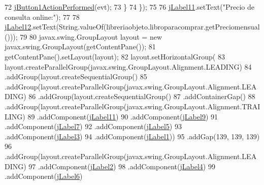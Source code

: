 \begin{DoxyCode}
72                 \mbox{\hyperlink{class_interfaz_package_1_1_consulta_libro_a043c35370f2e4eefae07c77fda717bf7}{jButton1ActionPerformed}}(evt);
73             \}
74         \});
75 
76         \mbox{\hyperlink{class_interfaz_package_1_1_consulta_libro_ae94f652b20072c79107b06192a514608}{jLabel11}}.setText(\textcolor{stringliteral}{"Precio de consulta online:"});
77 
78         \mbox{\hyperlink{class_interfaz_package_1_1_consulta_libro_a22c3d5f2c9bebc19190d3eb57195b720}{jLabel12}}.setText(String.valueOf(libreriaobjeto.libroparacomprar.getPreciomensual()));
79 
80         javax.swing.GroupLayout layout = \textcolor{keyword}{new} javax.swing.GroupLayout(getContentPane());
81         getContentPane().setLayout(layout);
82         layout.setHorizontalGroup(
83             layout.createParallelGroup(javax.swing.GroupLayout.Alignment.LEADING)
84             .addGroup(layout.createSequentialGroup()
85                 .addGroup(layout.createParallelGroup(javax.swing.GroupLayout.Alignment.LEADING)
86                     .addGroup(layout.createSequentialGroup()
87                         .addContainerGap()
88                         .addGroup(layout.createParallelGroup(javax.swing.GroupLayout.Alignment.TRAILING)
89                             .addComponent(\mbox{\hyperlink{class_interfaz_package_1_1_consulta_libro_ae94f652b20072c79107b06192a514608}{jLabel11}})
90                             .addComponent(\mbox{\hyperlink{class_interfaz_package_1_1_consulta_libro_ae312eda737e35580e0221ddbd8c17292}{jLabel9}})
91                             .addComponent(\mbox{\hyperlink{class_interfaz_package_1_1_consulta_libro_a218a7656528bb232eab4f384fed1254e}{jLabel7}})
92                             .addComponent(\mbox{\hyperlink{class_interfaz_package_1_1_consulta_libro_a49a4d4fb7a30f3fa6d4fe697b5bace17}{jLabel5}})
93                             .addComponent(\mbox{\hyperlink{class_interfaz_package_1_1_consulta_libro_a3e4a05b55099ee80351bac56cdc1734b}{jLabel3}})
94                             .addComponent(\mbox{\hyperlink{class_interfaz_package_1_1_consulta_libro_ac77c7946cb8103b592bd26c93868e6dc}{jLabel1}}))
95                         .addGap(139, 139, 139)
96                         .addGroup(layout.createParallelGroup(javax.swing.GroupLayout.Alignment.LEADING)
97                             .addComponent(\mbox{\hyperlink{class_interfaz_package_1_1_consulta_libro_af5b8586972d0b220d8fc909d2566798f}{jLabel2}})
98                             .addComponent(\mbox{\hyperlink{class_interfaz_package_1_1_consulta_libro_a38c193843e6fdef8523b06eb32530cde}{jLabel4}})
99                             .addComponent(\mbox{\hyperlink{class_interfaz_package_1_1_consulta_libro_aa7ab64f2b86ab31bd150020068712678}{jLabel6}})

\end{DoxyCode}
